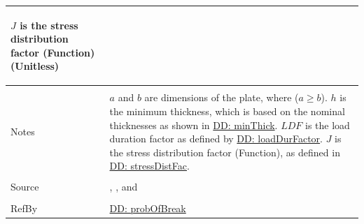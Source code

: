 \documentclass[12pt]{article}
\begin{document}
\begin{minipage}{\textwidth}
\begin{tabular}{>{\raggedright}p{}>{\raggedright\arraybackslash}p{}}
\begin{symbDescription}
                        \item{$J$ is the stress distribution factor (Function) (Unitless)}
                        \end{symbDescription}
          \\ \midrule \\
          Notes & $a$ and $b$ are dimensions of the plate, where ($a\geq{}b$).
                  $h$ is the minimum thickness, which is based on the nominal thicknesses as shown in \hyperref[DD:minThick]{DD: minThick}.
                  $LDF$ is the load duration factor as defined by \hyperref[DD:loadDurFactor]{DD: loadDurFactor}.
                  $J$ is the stress distribution factor (Function), as defined in \hyperref[DD:stressDistFac]{DD: stressDistFac}.
          \\ \midrule \\
          Source & \cite{astm2009}, \cite[(Eqs. 4-5)]{beasonEtAl1998}, and \cite[(Eq. 14)]{campidelli}
          \\ \midrule \\
          RefBy & \hyperref[DD:probOfBreak]{DD: probOfBreak}
          \\ \bottomrule
          \end{tabular}
          \end{minipage}
\par~
\end{document}
